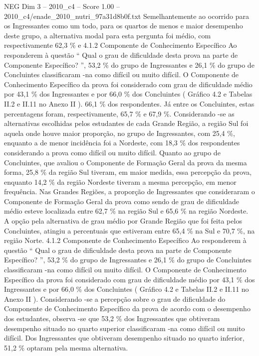 \begin{textsample}{NEG Dim 3 – 2010\_c4 – Score 1.00 – 2010\_c4/enade\_2010\_nutri\_97a31d8b0f.txt}
Semelhantemente ao ocorrido para os Ingressantes como um todo, para os quartos de menos e maior desempenho deste grupo, a alternativa modal para esta pergunta foi médio, com respectivamente 62,3 \% e 4.1.2 Componente de Conhecimento Específico Ao responderem à questão “ Qual o grau de dificuldade desta prova na parte de Componente Específico? ”, 53,2 \% do grupo de Ingressantes e 26,1 \% do grupo de Concluintes classificaram -na como difícil ou muito difícil.
O Componente de Conhecimento Específico da prova foi considerado com grau de dificuldade médio por 43,1 \% dos Ingressantes e por 66,0 \% dos Concluintes ( Gráfico 4.2 e Tabelas II.2 e II.11 no Anexo II ). 66,1 \% dos respondentes.
Já entre os Concluintes, estas percentagens foram, respectivamente, 65,7 \% e 67,9 \%.
Considerando -se as alternativas escolhidas pelos estudantes de cada Grande Região, a região Sul foi aquela onde houve maior proporção, no grupo de Ingressantes, com 25,4 \%, enquanto a de menor incidência foi a Nordeste, com 18,3 \% dos respondentes considerando a prova como difícil ou muito difícil.
Quanto ao grupo de Concluintes, que avaliou o Componente de Formação Geral da prova da mesma forma, 25,8 \% da região Sul tiveram, em maior medida, essa percepção da prova, enquanto 14,2 \% da região Nordeste tiveram a mesma percepção, em menor frequência.
Nas Grandes Regiões, a proporção de Ingressantes que consideraram o Componente de Formação Geral da prova como sendo de grau de dificuldade médio esteve localizada entre 62,7 \% na região Sul e 65,6 \% na região Nordeste.
A opção pela alternativa de grau médio por Grande Região que foi feita pelos Concluintes, atingiu a percentuais que estiveram entre 65,4 \% na Sul e 70,7 \%, na região Norte. 4.1.2 Componente de Conhecimento Específico Ao responderem à questão “ Qual o grau de dificuldade desta prova na parte de Componente Específico? ”, 53,2 \% do grupo de Ingressantes e 26,1 \% do grupo de Concluintes classificaram -na como difícil ou muito difícil.
O Componente de Conhecimento Específico da prova foi considerado com grau de dificuldade médio por 43,1 \% dos Ingressantes e por 66,0 \% dos Concluintes ( Gráfico 4.2 e Tabelas II.2 e II.11 no Anexo II ).
Considerando -se a percepção sobre o grau de dificuldade do Componente de Conhecimento Específico da prova de acordo com o desempenho dos estudantes, observa -se que 53,2 \% dos Ingressantes que obtiveram desempenho situado no quarto superior classificaram -na como difícil ou muito difícil.
Dos Ingressantes que obtiveram desempenho situado no quarto inferior, 51,2 \% optaram pela mesma alternativa.

\end{textsample}
